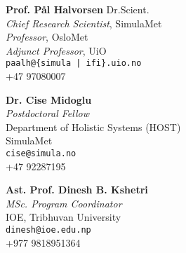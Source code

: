 \documentclass{resumex}
\begin{document}
\begin{center}
\begin{multicols}{3}
\textbf{Prof. Pål Halvorsen} Dr.Scient.\\
\textit{Chief Research Scientist}, SimulaMet\\
\textit{Professor}, OsloMet\\
\textit{Adjunct Professor}, UiO\\
\texttt{paalh@\{simula | ifi\}.uio.no}\\
+47 97080007
\vfill\null
\columnbreak

\textbf{Dr. Cise Midoglu}\\
\textit{Postdoctoral Fellow}\\
Department of Holistic Systems (HOST)\\
SimulaMet\\
\texttt{cise@simula.no}\\
+47 92287195
\vfill\null
\columnbreak

\textbf{Ast. Prof. Dinesh B. Kshetri}\\
\textit{MSc. Program Coordinator}\\
IOE, Tribhuvan University\\
\texttt{dinesh@ioe.edu.np}\\
+977 9818951364

\end{multicols}
\end{center}

\par\vfill\hfill{} 
\clearpage
\end{document}
